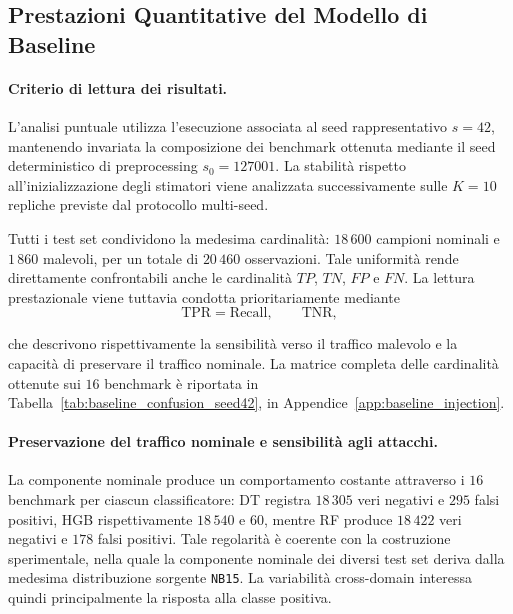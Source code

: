 
\subsection{Prestazioni Quantitative del Modello di Baseline}
\label{subsec:baseline_prestazioni_comparative}

\paragraph{Criterio di lettura dei risultati.}
L'analisi puntuale utilizza l'esecuzione associata al seed rappresentativo $s=42$, mantenendo invariata la composizione dei benchmark ottenuta mediante il seed deterministico di preprocessing $s_{0}=127001$. 
La stabilità rispetto all'inizializzazione degli stimatori viene analizzata successivamente sulle $K=10$ repliche previste dal protocollo multi-seed.

Tutti i test set condividono la medesima cardinalità:
$18\,600$ campioni nominali e $1\,860$ malevoli, per un totale di $20\,460$ osservazioni. 
Tale uniformità rende direttamente confrontabili anche le cardinalità $TP$, $TN$, $FP$ e $FN$. 
La lettura prestazionale viene tuttavia condotta prioritariamente mediante
\[
    \mathrm{TPR}=\mathrm{Recall},
    \qquad
    \mathrm{TNR},
\]

che descrivono rispettivamente la sensibilità verso il traffico malevolo e la capacità di preservare il traffico nominale. 
La matrice completa delle cardinalità ottenute sui $16$ benchmark è riportata in Tabella~\ref{tab:baseline_confusion_seed42}, in Appendice~\ref{app:baseline_injection}.

\paragraph{Preservazione del traffico nominale e sensibilità agli attacchi.}
La componente nominale produce un comportamento costante attraverso i $16$ benchmark per ciascun classificatore: DT registra $18\,305$ veri negativi e $295$ falsi positivi, HGB rispettivamente $18\,540$ e $60$, mentre RF produce $18\,422$ veri negativi e $178$ falsi positivi. 
Tale regolarità è coerente con la costruzione sperimentale, nella quale la componente nominale dei diversi test set deriva dalla medesima distribuzione sorgente \texttt{NB15}. 
La variabilità cross-domain interessa quindi principalmente la risposta alla classe positiva.


